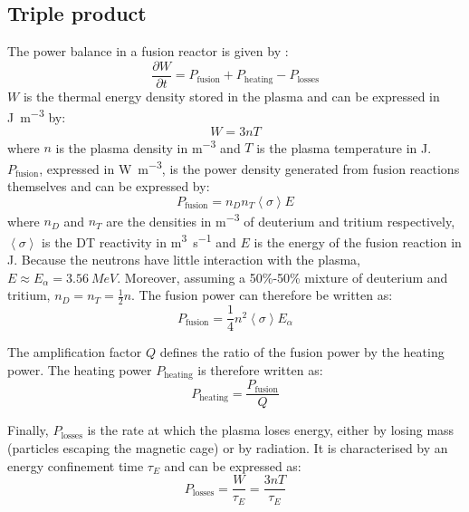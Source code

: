 \subsection{Triple product}
The power balance in a fusion reactor is given by \cite{mccracken_fusion_2013}:
\begin{equation}
    \frac{\partial W}{\partial t} = P_\mathrm{fusion} + P_\mathrm{heating} - P_\mathrm{losses}
    \label{eq: plasma energy balance}
\end{equation}
$W$ is the thermal energy density stored in the plasma and can be expressed in \si{J.m^{-3}} by:
\begin{equation}
    W = 3 n T
\end{equation}
where $n$ is the plasma density in \si{m^{-3}} and $T$ is the plasma temperature in \si{J}.
$P_\mathrm{fusion}$, expressed in \si{W.m^{-3}}, is the power density generated from fusion reactions themselves and can be expressed by:
\begin{equation}
    P_\mathrm{fusion} = n_D n_T \left\langle \sigma \right\rangle E
\end{equation}
where $n_D$ and $n_T$ are the densities in \si{m^{-3}} of deuterium and tritium respectively, $\left\langle \sigma \right\rangle$ is the DT reactivity in \si{m^3.s^{-1}} and $E$ is the energy of the fusion reaction in \si{J}.
Because the neutrons have little interaction with the plasma, $E \approx E_\alpha = \SI{3.56}{MeV}$.
Moreover, assuming a 50\%-50\% mixture of deuterium and tritium, $n_D = n_T = \frac{1}{2} n$.
The fusion power can therefore be written as:
\begin{equation}
    P_\mathrm{fusion} = \frac{1}{4} n^2 \left\langle \sigma \right\rangle E_\alpha
\end{equation}

The amplification factor $Q$ defines the ratio of the fusion power by the heating power.
The heating power $P_\mathrm{heating}$ is therefore written as:
\begin{equation}
    P_\mathrm{heating} = \frac{P_\mathrm{fusion}}{Q}
\end{equation}

Finally, $P_\mathrm{losses}$ is the rate at which the plasma loses energy, either by losing mass (particles escaping the magnetic cage) or by radiation.
It is characterised by an energy confinement time $\tau_E$ and can be expressed as:
\begin{equation}
    P_\mathrm{losses} = \frac{W}{\tau_E} = \frac{3 n T}{\tau_E}
\end{equation}

